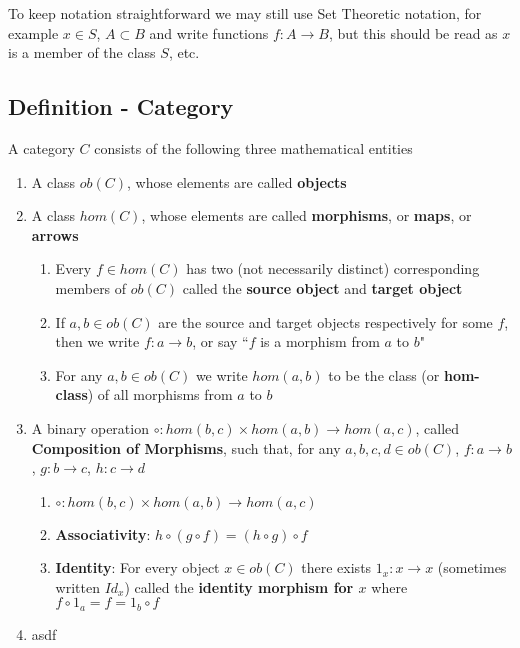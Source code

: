 \documentclass[9pt]{article} %
\begin{document}
To keep notation straightforward we may still use Set Theoretic notation, for example $x \in S$, $A \subset B$ and write functions $f: A \rightarrow B$, but this should be read as $x$ is a member of the class $S$, etc.

\subsection{Definition - Category}

A category $C$ consists of the following three mathematical entities

\begin{enumerate}
    \item A class $ob(C)$, whose elements are called \textbf{objects}
    \item A class $hom(C)$, whose elements are called \textbf{morphisms}, or \textbf{maps}, or \textbf{arrows}
    \begin{enumerate}
        \item Every $f \in hom(C)$ has two (not necessarily distinct) corresponding members of $ob(C)$ called the \textbf{source object} and \textbf{target object}
        \item If $a, b \in ob(C)$ are the source and target objects respectively for some $f$, then we write $f: a \rightarrow b$, or say ``$f$ is a morphism from $a$ to $b$"
        \item For any $a, b \in ob(C)$ we write $hom(a, b)$ to be the class (or \textbf{hom-class}) of all morphisms from $a$ to $b$
    \end{enumerate}
    \item A binary operation $\circ: hom(b, c) \times hom(a, b) \rightarrow hom(a, c)$, called \textbf{Composition of Morphisms}, such that, for any $a, b, c, d \in ob(C)$, $f: a \rightarrow b$, $g: b \rightarrow c$, $h: c \rightarrow d$
    \begin{enumerate}
        \item $\circ: hom(b, c) \times hom(a, b) \rightarrow hom(a, c)$
        \item \textbf{Associativity}: $h \circ (g \circ f) = (h \circ g) \circ f$
        \item \textbf{Identity}: For every object $x \in ob(C)$ there exists $1_x: x \rightarrow x$ (sometimes written $Id_x$) called the \textbf{identity morphism for $x$} where $f \circ 1_a = f = 1_b \circ f$
    \end{enumerate}
    \item asdf
\end{enumerate}
\end{document}
